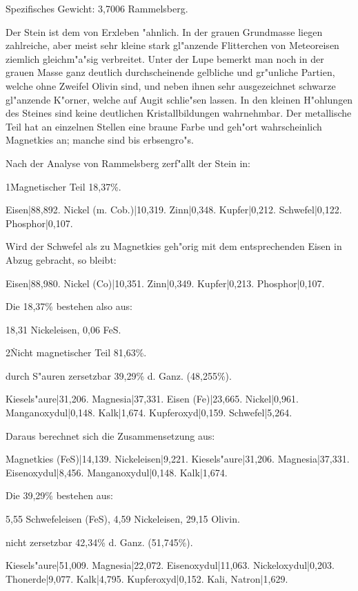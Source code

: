 \documentclass[a4paper, 11pt, oneside]{article}
\begin{document}
Spezifisches Gewicht: 3,7006 Rammelsberg.

Der Stein ist dem von Erxleben "ahnlich. In der grauen Grundmasse liegen zahlreiche, aber meist sehr kleine stark gl"anzende Flitterchen von Meteoreisen ziemlich gleichm"a"sig verbreitet. Unter der Lupe bemerkt man noch in der grauen Masse ganz deutlich durchscheinende gelbliche und gr"unliche Partien, welche ohne Zweifel Olivin sind, und neben ihnen sehr ausgezeichnet schwarze gl"anzende K"orner, welche auf Augit schlie"sen lassen. In den kleinen H"ohlungen des Steines sind keine deutlichen Kristallbildungen wahrnehmbar. Der metallische Teil hat an einzelnen Stellen eine braune Farbe und geh"ort wahrscheinlich Magnetkies an; manche sind bis erbsengro"s.

Nach der Analyse von Rammelsberg zerf"allt der Stein in:

1\. Magnetischer Teil 18,37\%.

Eisen|88,892.  
Nickel (m. Cob.)|10,319.  
Zinn|0,348.  
Kupfer|0,212.  
Schwefel|0,122.  
Phosphor|0,107.

Wird der Schwefel als zu Magnetkies geh"orig mit dem entsprechenden Eisen in Abzug gebracht, so bleibt:

Eisen|88,980.  
Nickel (Co)|10,351.  
Zinn|0,349.  
Kupfer|0,213.  
Phosphor|0,107.  

Die 18,37\% bestehen also aus:

18,31 Nickeleisen,  
0,06 FeS.

2\. Nicht magnetischer Teil 81,63\%.

durch S"auren zersetzbar 39,29\% d. Ganz. (48,255\%).

Kiesels"aure|31,206.  
Magnesia|37,331.  
Eisen (Fe)|23,665.  
Nickel|0,961.  
Manganoxydul|0,148.  
Kalk|1,674.  
Kupferoxyd|0,159.  
Schwefel|5,264. 

Daraus berechnet sich die Zusammensetzung aus:

Magnetkies (FeS)|14,139.  
Nickeleisen|9,221.  
Kiesels"aure|31,206.  
Magnesia|37,331.  
Eisenoxydul|8,456.  
Manganoxydul|0,148.  
Kalk|1,674.

Die 39,29\% bestehen aus:

5,55 Schwefeleisen (FeS),  
4,59 Nickeleisen,  
29,15 Olivin.

nicht zersetzbar 42,34\% d. Ganz. (51,745\%).

Kiesels"aure|51,009.  
Magnesia|22,072.  
Eisenoxydul|11,063.  
Nickeloxydul|0,203.  
Thonerde|9,077.  
Kalk|4,795.  
Kupferoxyd|0,152.  
Kali, Natron|1,629.  
\end{document}
